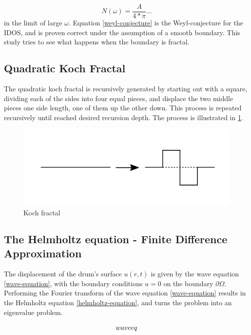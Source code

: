 \documentclass{article}
\begin{document}
\begin{equation}
    \label{weyl-conjecture}
    N(\omega) = \frac{A}{4*\pi}...
\end{equation}
in the limit of large $\omega$. Equation \ref{weyl-conjecture} is the Weyl-conjecture for the IDOS, and is proven correct under the assumption of a smooth boundary. This study tries to see what happens when the boundary is fractal.

\subsection{Quadratic Koch Fractal}\label{theory-koch}
The quadratic koch fractal is recursively generated by starting out with a square, dividing each of the sides into four equal pieces, and displace the two middle pieces one side length, one of them up the other down. This process is repeated recursively until reached desired recursion depth. The process is illustrated in \ref{generate-koch}.

\begin{figure}[tbp]
    \includegraphics[width=\linewidth, trim={0 3cm 0 3cm}]{./media/koch_frac_step.pdf}
    \caption{Koch fractal}
    \label{generate-koch}
\end{figure}

\subsection{The Helmholtz equation - Finite Difference Approximation}
The displacement of the drum's surface $u(r, t)$ is given by the wave equation \ref{wave-equation}, with the boundary conditions $u = 0$ on the boundary $\partial \Omega$. Performing the Fourier transform of the wave equation \ref{wave-equation} results in the Helmholtz equation \ref{helmholtz-equation}, and turns the problem into an eigenvalue problem.

\begin{equation}
    waveeq \\
\end{equation}
\end{document}
